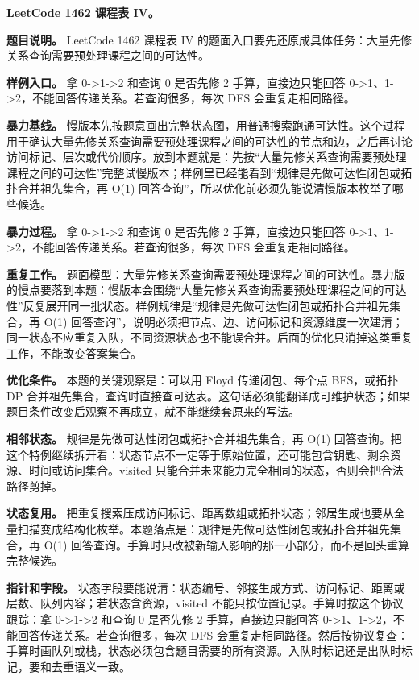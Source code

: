\noindent\textbf{LeetCode 1462 课程表 IV。}

\textbf{题目说明。} LeetCode 1462 课程表 IV 的题面入口要先还原成具体任务：大量先修关系查询需要预处理课程之间的可达性。

\textbf{样例入口。} 拿 0->1->2 和查询 0 是否先修 2 手算，直接边只能回答 0->1、1->2，不能回答传递关系。若查询很多，每次 DFS 会重复走相同路径。

\textbf{暴力基线。} 慢版本先按题意画出完整状态图，用普通搜索跑通可达性。这个过程用于确认大量先修关系查询需要预处理课程之间的可达性的节点和边，之后再讨论访问标记、层次或代价顺序。放到本题就是：先按“大量先修关系查询需要预处理课程之间的可达性”完整试慢版本；样例里已经能看到“规律是先做可达性闭包或拓扑合并祖先集合，再 O(1) 回答查询”，所以优化前必须先能说清慢版本枚举了哪些候选。

\textbf{暴力过程。} 拿 0->1->2 和查询 0 是否先修 2 手算，直接边只能回答 0->1、1->2，不能回答传递关系。若查询很多，每次 DFS 会重复走相同路径。

\textbf{重复工作。} 题面模型：大量先修关系查询需要预处理课程之间的可达性。暴力版的慢点要落到本题：慢版本会围绕“大量先修关系查询需要预处理课程之间的可达性”反复展开同一批状态。样例规律是“规律是先做可达性闭包或拓扑合并祖先集合，再 O(1) 回答查询”，说明必须把节点、边、访问标记和资源维度一次建清；同一状态不应重复入队，不同资源状态也不能误合并。后面的优化只消掉这类重复工作，不能改变答案集合。

\textbf{优化条件。} 本题的关键观察是：可以用 Floyd 传递闭包、每个点 BFS，或拓扑 DP 合并祖先集合，查询时直接查可达表。这句话必须能翻译成可维护状态；如果题目条件改变后观察不再成立，就不能继续套原来的写法。

\textbf{相邻状态。} 规律是先做可达性闭包或拓扑合并祖先集合，再 O(1) 回答查询。把这个特例继续拆开看：状态节点不一定等于原始位置，还可能包含钥匙、剩余资源、时间或访问集合。visited 只能合并未来能力完全相同的状态，否则会把合法路径剪掉。

\textbf{状态复用。} 把重复搜索压成访问标记、距离数组或拓扑状态；邻居生成也要从全量扫描变成结构化枚举。本题落点是：规律是先做可达性闭包或拓扑合并祖先集合，再 O(1) 回答查询。手算时只改被新输入影响的那一小部分，而不是回头重算完整候选。

\textbf{指针和字段。} 状态字段要能说清：状态编号、邻接生成方式、访问标记、距离或层数、队列内容；若状态含资源，visited 不能只按位置记录。手算时按这个协议跟踪：拿 0->1->2 和查询 0 是否先修 2 手算，直接边只能回答 0->1、1->2，不能回答传递关系。若查询很多，每次 DFS 会重复走相同路径。然后按协议复查：手算时画队列或栈，状态必须包含题目需要的所有资源。入队时标记还是出队时标记，要和去重语义一致。


